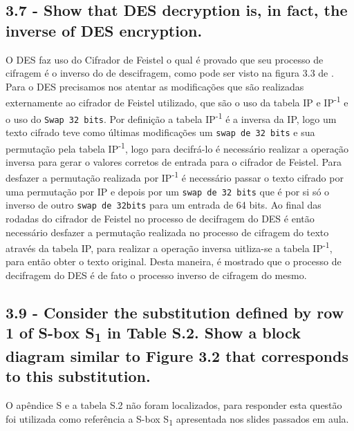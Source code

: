 \documentclass[
    article,            %
    11pt,               %
    oneside,            %
    a4paper,            %
    english,            %
    brazil,             %
    sumario=tradicional,
    ]{abntex2}
\begin{document}
\subsection*{\textbf{3.7 - Show that DES decryption is, in fact, the inverse of DES encryption.}}

O DES faz uso do Cifrador de Feistel o qual é provado que seu processo de cifragem é o inverso do de descifragem, como pode ser visto na figura 3.3 de \cite{Stallings:2005:CNS:1076613}. Para o DES precisamos nos atentar as modificações que são realizadas externamente ao cifrador de Feistel utilizado, que são o uso da tabela IP e IP\textsuperscript{-1} e o uso do \texttt{Swap 32 bits}. Por definição a tabela IP\textsuperscript{-1} é a inversa da IP, logo um texto cifrado teve como últimas modificações um \texttt{swap de 32 bits} e sua permutação pela tabela IP\textsuperscript{-1}, logo para decifrá-lo é necessário realizar a operação inversa para gerar o valores corretos de entrada para o cifrador de Feistel. Para desfazer a permutação realizada por IP\textsuperscript{-1} é necessário passar o texto cifrado por uma permutação por IP e depois por um \texttt{swap de 32 bits} que é por si só o inverso de outro \texttt{swap de 32bits} para um entrada de 64 bits. Ao final das rodadas do cifrador de Feistel no processo de decifragem do DES é então necessário desfazer a permutação realizada no processo de cifragem do texto através da tabela IP, para realizar a operação inversa uitliza-se a tabela IP\textsuperscript{-1}, para então obter o texto original. Desta maneira, é mostrado que o processo de decifragem do DES é de fato o processo inverso de cifragem do mesmo. 

\subsection*{\textbf{3.9 - Consider the substitution defined by row 1 of S-box S\textsubscript{1} in Table S.2. Show a block diagram similar to Figure 3.2 that corresponds to this substitution.}}

O apêndice S e a tabela S.2 não foram localizados, para responder esta questão foi utilizada como referência a S-box S\textsubscript{1} apresentada nos slides passados em aula.
\end{document}
